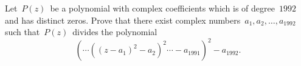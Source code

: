 Let $\, P(z) \,$ be a polynomial with complex coefficients which is of degree $\, 1992 \,$ and has distinct zeros. Prove that there exist complex numbers $\, a_1, a_2, \ldots, a_{1992} \,$ such that $\, P(z) \,$ divides the polynomial \[ \left( \cdots \left( (z-a_1)^2 - a_2 \right)^2 \cdots - a_{1991} \right)^2 - a_{1992}.  \]
